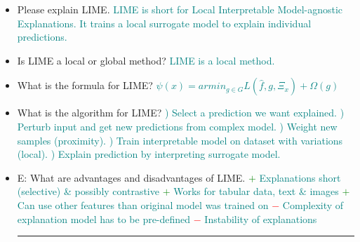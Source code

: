 \documentclass{report}
\newcommand{\asw}[2][teal]{}
\renewcommand{\asw}[2][teal]{\textcolor{#1}{#2}}
\begin{document}
\begin{itemize}
	\item Please explain LIME.
	\asw{\newline LIME is short for Local Interpretable Model-agnostic Explanations. It trains a local surrogate model to explain individual predictions.}
	\item Is LIME a local or global method?
	\asw{\newline LIME is a local method.}
	\item What is the formula for LIME?
	\asw{\newline $\psi(x) = armin_{g \in G} L(\hat{f}, g, \Xi_x) + \Omega(g)$}
	\item What is the algorithm for LIME?
	\asw{) Select a prediction we want explained.
		\newline 2) Perturb input and get new predictions from complex model.
		\newline 3) Weight new samples (proximity).
		\newline 4) Train interpretable model on dataset with variations (local).
		\newline 5) Explain prediction by interpreting surrogate model.}
	\item E: What are advantages and disadvantages of LIME.
	\asw{\newline \textcolor{green}{$+$} Explanations short (selective) \& possibly contrastive
		\newline \textcolor{green}{$+$} Works for tabular data, text \& images
		\newline \textcolor{green}{$+$} Can use other features than original model was trained on
		\newline \textcolor{red}{$-$} Complexity of explanation model has to be pre-defined
		\newline \textcolor{red}{$-$} Instability of explanations
	}
	\newline
	\hrule 
	

\end{itemize}
\end{document}
